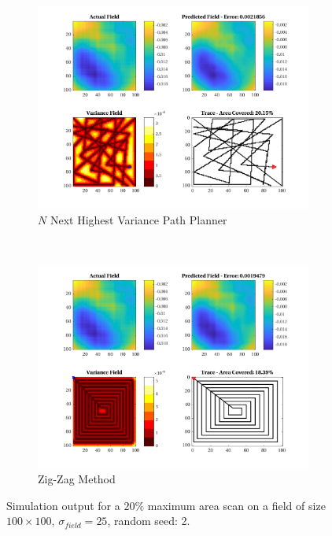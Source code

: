 \begin{figure}[htb!]
\begin{subfigure}[t]{0.5\textwidth}
    \end{subfigure}%
    \\
    \begin{subfigure}[t]{0.5\textwidth}
        \centering
        \includegraphics[width=\linewidth]{figures/hbresults/nnhv_20p_100x100_sf_25_seed_2.png}
        \captionsetup{skip=0.10\baselineskip,size=footnotesize}
        \caption{$N$ Next Highest Variance Path Planner}
    \end{subfigure}%
    ~
    \begin{subfigure}[t]{0.5\textwidth}
        \centering
        \includegraphics[width=\linewidth]{figures/hbresults/zz_20p_100x100_sf_25_seed_2.png}
        \captionsetup{skip=0.10\baselineskip,size=footnotesize}
        \caption{Zig-Zag Method}
    \end{subfigure}%
    \captionsetup{skip=0.20\baselineskip}
    \caption{Simulation output for a $20\%$ maximum area scan on a field of size $100 \times 100$, $\sigma_{field} = 25$, random seed: 2.}
    \label{fig:sim_sigma25_p20_s2}
\end{figure}

